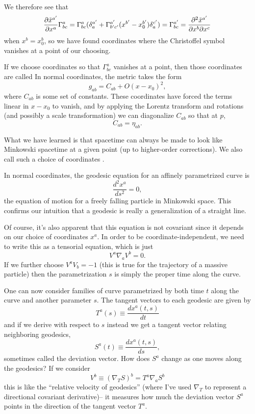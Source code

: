 We therefore see that
$$\frac{\partial \tilde x^{a'}}{\partial x^a} \Gamma^a_{bc}= \Gamma^a_{bc} (\delta^{a'}_a +\Gamma^{a'}_{b'c'}(x^{b'}-x^{b'}_0)\delta^{c'}_a)=\Gamma^{a'}_{bc}= \frac{\partial^2 \tilde x^{a'}}{\partial x^b \partial x^c}$$
when $x^b=x^b_0$, so we have found coordinates where the Christoffel symbol vanishes at a point of our choosing.

\begin{defn}
If we choose coordinates so that $\Gamma^a_{bc}$ vanishes at a point, then those coordinates are called  In normal coordinates, the metric takes the form
$$g_{ab}=C_{ab}+O(x-x_0)^2,$$
where $C_{ab}$ is some set of constants. These coordinates have forced the terms linear in $x-x_0$ to vanish, and by applying the Lorentz transform and rotations (and possibly a scale transformation) we can diagonalize $C_{ab}$ so that at $p$,
$$C_{ab}=\eta_{ab}.$$
\end{defn}
What we have learned is that spacetime can always be made to look like Minkowski spacetime at a given point (up to higher-order corrections). We also call such a choice of coordinates .

In normal coordinates, the geodesic equation for an affinely parametrized curve is
$$\frac{d^2x^a}{ds^2}=0,$$
the equation of motion for a freely falling particle in Minkowski space. This confirms our intuition that a geodesic is really a generalization of a straight line.

Of course, it's also apparent that this equation is not covariant since it depends on our choice of coordinates $x^a$. In order to be coordinate-independent, we need to write this as a tensorial equation, which is just
$$V^a\nabla_a V^b=0.$$ If we further choose $V^a V_b=-1$ (this is true for the trajectory of a massive particle) then the parametrization $s$ is simply the proper time along the curve.

One can now consider families of curve parametrized by both time $t$ along the curve and another parameter $s$. The tangent vectors to each geodesic are given by
$$T^a(s) \equiv \frac{dx^a(t,s)}{dt}$$
and if we derive with respect to $s$ instead we get a tangent vector relating neighboring geodesics,
$$S^a(t)\equiv\frac{dx^a(t,s)}{ds},$$
sometimes called the deviation vector.
How does $S^a$ change as one moves along the geodesics? If we consider
$$V^b \equiv (\nabla_T S)^b=T^a\nabla_a S^b$$ this is like the ``relative velocity of geodesics'' (where I've used $\nabla_T$ to represent a directional covariant derivative)-- it measures how much the deviation vector $S^a$ points in the direction of the tangent vector $T^a$.

